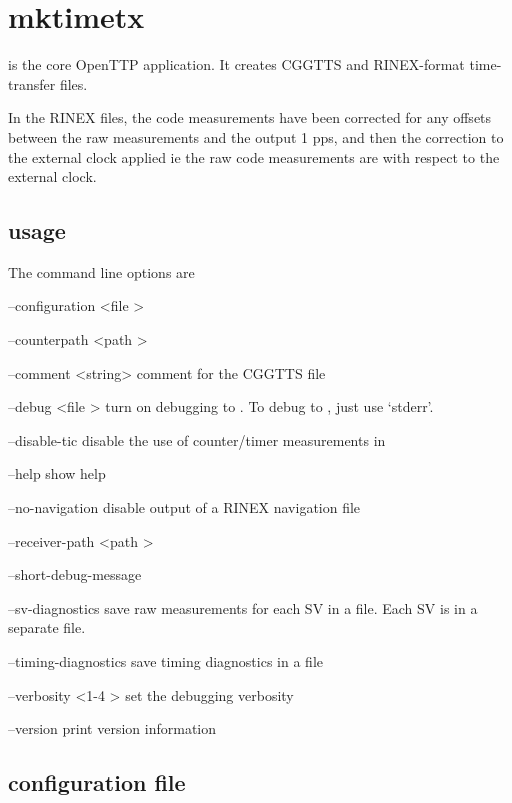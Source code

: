 
\section{mktimetx}

\hypertarget{h:mktimetx}{}

 is the core OpenTTP application.
It creates CGGTTS and RINEX-format time-transfer files.

In the RINEX files, the code measurements have been corrected for any offsets between the raw measurements
and the output 1 pps, and then the correction to the external clock applied ie the raw code measurements
are with respect to the external clock.

\subsection{usage}

The command line options are
\begin{description*}
	\item[--configuration \textless file \textgreater] 
	\item[--counterpath \textless path \textgreater]	
	\item[--comment \textless string>] comment for the CGGTTS file	
	\item[--debug \textless file \textgreater]	turn on debugging to . To debug to , just use `stderr'.
	\item[--disable-tic] disable the use of counter/timer measurements in 
	\item[--help] show help
	\item[--no-navigation] disable output of a RINEX navigation file
	\item[--receiver-path \textless path \textgreater]
	\item[--short-debug-message]
	\item[--sv-diagnostics] save raw measurements for each SV in a file. Each SV is in a separate file.
	\item[--timing-diagnostics] save timing diagnostics in a file
	\item[--verbosity \textless 1-4 \textgreater] set the debugging verbosity
	\item[--version] print version information	
\end{description*}

\subsection{configuration file}

